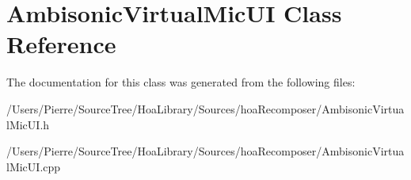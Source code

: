 \hypertarget{class_ambisonic_virtual_mic_u_i}{\section{Ambisonic\-Virtual\-Mic\-U\-I Class Reference}
\label{class_ambisonic_virtual_mic_u_i}
}


The documentation for this class was generated from the following files\-:\begin{DoxyCompactItemize}
\item 
/\-Users/\-Pierre/\-Source\-Tree/\-Hoa\-Library/\-Sources/hoa\-Recomposer/Ambisonic\-Virtual\-Mic\-U\-I.\-h\item 
/\-Users/\-Pierre/\-Source\-Tree/\-Hoa\-Library/\-Sources/hoa\-Recomposer/Ambisonic\-Virtual\-Mic\-U\-I.\-cpp\end{DoxyCompactItemize}
